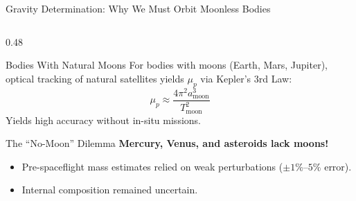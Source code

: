 \documentclass[aspectratio=169, 10pt]{beamer}
\begin{document}
\begin{frame}{Gravity Determination: Why We Must Orbit Moonless Bodies}
    \begin{columns}[t]
        \begin{column}{0.48\textwidth}
            \begin{block}{Bodies With Natural Moons}
                \scriptsize
                For bodies with moons (Earth, Mars, Jupiter), optical tracking of natural satellites yields $\mu_p$ via Kepler's 3rd Law:
                \vspace{-0.12cm}
                \begin{equation*}
                    \mu_p \approx \frac{4\pi^2 a_{\text{moon}}^3}{T_{\text{moon}}^2}
                \end{equation*}
                \vspace{-0.1cm}
                Yields high accuracy without in-situ missions.
            \end{block}

            \vspace{-0.1cm}

            \begin{alertblock}{The ``No-Moon'' Dilemma}
                \scriptsize
                \textbf{Mercury, Venus, and asteroids lack moons!}
                \begin{itemize}\setlength{\itemsep}{0pt}\setlength{\topsep}{1pt}
                    \item Pre-spaceflight mass estimates relied on weak perturbations ($\pm 1\%\text{--}5\%$ error).
                    \item Internal composition remained uncertain.
                \end{itemize}
            \end{alertblock}
        \end{column}


\end{columns}
\end{frame}
\end{document}
